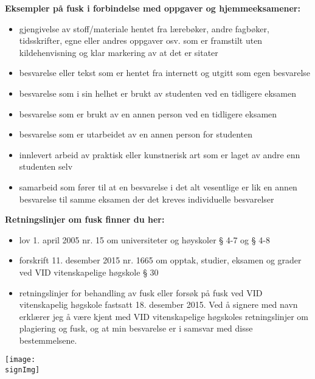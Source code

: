 \begin{scriptsize}

\noindent
\textbf{Eksempler på fusk i forbindelse med oppgaver og hjemmeeksamener:}
\begin{itemize}[leftmargin=0.5cm]
\item gjengivelse av stoff/materiale hentet fra lærebøker, andre fagbøker, tidsskrifter, egne eller andres oppgaver osv. som er framstilt uten kildehenvisning og klar markering av at det er sitater 
\item besvarelse eller tekst som er hentet fra internett og utgitt som egen besvarelse 
\item besvarelse som i sin helhet er brukt av studenten ved en tidligere eksamen 
\item besvarelse som er brukt av en annen person ved en tidligere eksamen 
\item besvarelse som er utarbeidet av en annen person for studenten 
\item innlevert arbeid av praktisk eller kunstnerisk art som er laget av andre enn studenten selv 
\item samarbeid som fører til at en besvarelse i det alt vesentlige er lik en annen besvarelse til samme eksamen der det kreves individuelle besvarelser
\end{itemize}

\noindent
\textbf{Retningslinjer om fusk finner du her:}
\begin{itemize}[leftmargin=0.5cm]
\item lov 1. april 2005 nr. 15 om universiteter og høyskoler § 4-7 og § 4-8 
\item forskrift 11. desember 2015 nr. 1665 om opptak, studier, eksamen og grader ved VID vitenskapelige høgskole § 30
\item retningslinjer for behandling av fusk eller forsøk på fusk ved VID vitenskapelig høgskole fastsatt 18. desember 2015.
Ved å signere med navn erklærer jeg å være kjent med VID vitenskapelige høgskoles retningslinjer om plagiering og fusk, og at min besvarelse er i samsvar med disse bestemmelsene.
\end{itemize}
\end{scriptsize}

\begin{center}
	\vspace*{\fill}
	\texttt{[image: \\signImg]}
	\vspace*{\fill}
\end{center}
